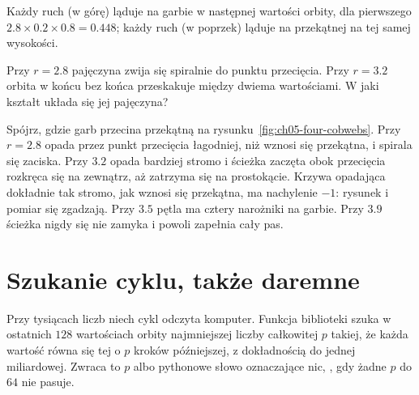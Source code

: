 

\noindent
Każdy ruch  (w górę) ląduje na garbie w następnej wartości orbity,
dla pierwszego $\num{2.8} \times \num{0.2} \times \num{0.8} = \num{0.448}$;
każdy ruch  (w poprzek) ląduje na przekątnej na tej samej
wysokości.

\begin{think}
Przy $r = \num{2.8}$ pajęczyna zwija się spiralnie do punktu przecięcia.
Przy $r = \num{3.2}$ orbita w końcu bez końca przeskakuje między dwiema
wartościami. W jaki kształt układa się jej pajęczyna?
\end{think}


\noindent
Spójrz, gdzie garb przecina przekątną na
rysunku~\ref{fig:ch05-four-cobwebs}. Przy $r = \num{2.8}$ opada przez
punkt przecięcia łagodniej, niż wznosi się przekątna, i spirala się
zaciska. Przy $\num{3.2}$ opada bardziej stromo i ścieżka zaczęta obok
przecięcia rozkręca się na zewnątrz, aż zatrzyma się na prostokącie.
Krzywa opadająca dokładnie tak stromo, jak wznosi się przekątna, ma
nachylenie $-1$: rysunek i pomiar się zgadzają. Przy $\num{3.5}$ pętla ma cztery
narożniki na garbie. Przy $\num{3.9}$ ścieżka nigdy się nie zamyka i powoli
zapełnia cały pas.

\section{Szukanie cyklu, także daremne}
\label{sec:ch05-period}

\noindent
Przy tysiącach liczb niech cykl odczyta komputer. Funkcja biblioteki
 szuka w ostatnich $128$ wartościach orbity najmniejszej liczby
całkowitej $p$ takiej, że każda wartość równa się tej o $p$ kroków
późniejszej, z dokładnością do jednej miliardowej. Zwraca to $p$ albo
pythonowe słowo oznaczające nic, , gdy żadne $p$ do $64$ nie
pasuje.

